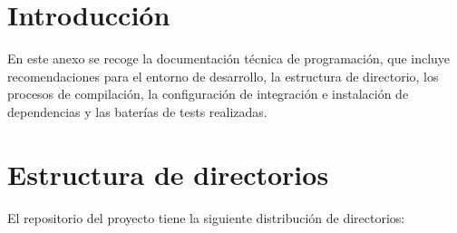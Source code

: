 
\section{Introducción}

En este anexo se recoge la documentación técnica de programación, que incluye recomendaciones para el entorno de desarrollo, la estructura de directorio, los procesos de compilación, la configuración de integración e instalación de dependencias y las baterías de tests realizadas. 

\section{Estructura de directorios}

El repositorio del proyecto tiene la siguiente distribución de directorios:

